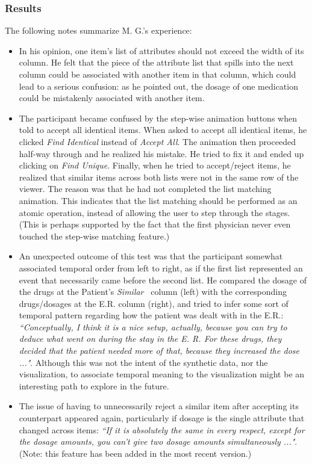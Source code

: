 \documentclass{chi2009}
\newcommand{\Similar}{\textit{Similar}}
\begin{document}
\subsubsection{Results}
The following notes summarize M. G.'s experience:
\begin{itemize}
\item In his opinion, one item's list of attributes should not exceed the width of its column. He felt that the piece of the attribute list that spills into the next column could be associated with another item in that column, which could lead to a serious confusion: as he pointed out, the dosage of one medication could be mistakenly associated with another item.
\item The participant became confused by the step-wise animation buttons when told to accept all identical items. When asked to accept all identical items, he clicked  \textit{Find Identical} instead of \textit{Accept All}. The animation then proceeded half-way through and he realized his mistake. He tried to fix it and ended up clicking on \textit{Find Unique}. Finally, when he tried to accept/reject items, he realized that similar items across both lists were not in the same row of the viewer. The reason was that he had not completed the list matching animation. This indicates that the list matching should be performed as an atomic operation, instead of allowing the user to step through the stages. (This is perhaps supported by the fact that the first physician never even touched the step-wise matching feature.)
\item An unexpected outcome of this test was that the participant somewhat associated temporal order from left to right, as if the first list represented an event that necessarily came before the second list. He compared the dosage of the drugs at the Patient's \Similar~ column (left) with the corresponding drugs/dosages at the E.R. column (right), and tried to infer some sort of temporal pattern regarding how the patient was dealt with in the E.R.: \textit{``Conceptually, I think it is a nice setup, actually, because you can try to deduce what went on during the stay in the E. R. For these drugs, they decided that the patient needed more of that, because they increased the dose ..."}. Although this was not the intent of the synthetic data, nor the visualization, to associate temporal meaning to the visualization might be an interesting path to explore in the future.
\item The issue of having to unnecessarily reject a similar item after accepting its counterpart appeared again, particularly if dosage is the single attribute that changed across items: \textit{``If it is absolutely the same in every respect, except for the dosage amounts, you can't give two dosage amounts simultaneously ..."}. (Note: this feature has been added in the most recent version.)
\end{itemize}
\end{document}
